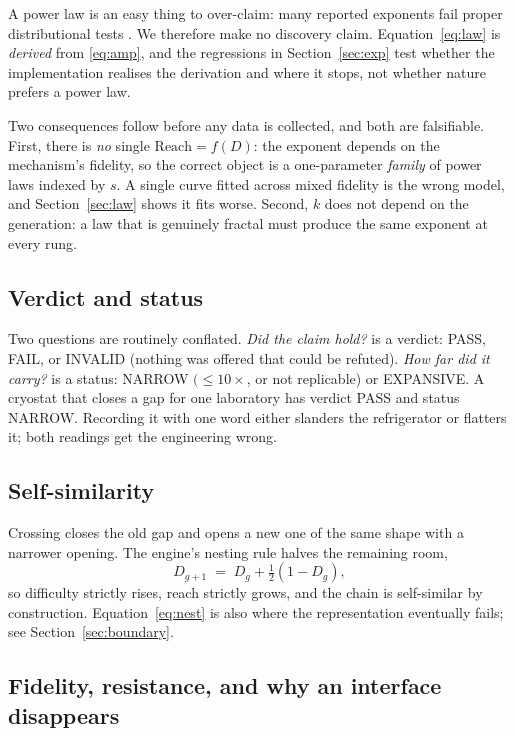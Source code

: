 \documentclass[conference]{IEEEtran}
\theoremstyle{definition}
\begin{document}
A power law is an easy thing to over-claim: many reported exponents fail proper
distributional tests \cite{clauset2009}. We therefore make no discovery claim.
Equation~\eqref{eq:law} is \emph{derived} from \eqref{eq:amp}, and the regressions
in Section~\ref{sec:exp} test whether the implementation realises the derivation
and where it stops, not whether nature prefers a power law.

Two consequences follow before any data is collected, and both are falsifiable.
First, there is \emph{no} single $\mathrm{Reach}=f(D)$: the exponent depends on the
mechanism's fidelity, so the correct object is a one-parameter \emph{family} of
power laws indexed by $s$. A single curve fitted across mixed fidelity is the wrong
model, and Section~\ref{sec:law} shows it fits worse. Second, $k$ does not depend
on the generation: a law that is genuinely fractal must produce the same exponent
at every rung.

\subsection{Verdict and status}

Two questions are routinely conflated. \emph{Did the claim hold?} is a verdict:
PASS, FAIL, or INVALID (nothing was offered that could be refuted). \emph{How far
did it carry?} is a status: NARROW $(\le 10\times$, or not replicable) or
EXPANSIVE. A cryostat that closes a gap for one laboratory has verdict PASS and
status NARROW. Recording it with one word either slanders the refrigerator or
flatters it; both readings get the engineering wrong.

\subsection{Self-similarity}
\label{sec:selfsim}

Crossing closes the old gap and opens a new one of the same shape with a narrower
opening. The engine's nesting rule halves the remaining room,
\begin{equation}
D_{g+1} \;=\; D_g + \tfrac{1}{2}\left(1-D_g\right),
\label{eq:nest}
\end{equation}
so difficulty strictly rises, reach strictly grows, and the chain is self-similar
by construction. Equation~\eqref{eq:nest} is also where the representation
eventually fails; see Section~\ref{sec:boundary}.

\subsection{Fidelity, resistance, and why an interface disappears}
\label{sec:fidelity}
\end{document}
